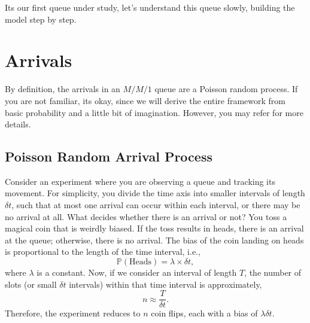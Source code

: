 \documentclass[11pt, a4paper]{report}
\begin{document}
Its our first queue under study, let's understand this queue slowly, building the model step by step.

\section{Arrivals}
By definition, the arrivals in an $M/M/1$ queue are a Poisson random process. If you are not familiar, its okay, since we will derive the entire framework from basic probability and a little bit of imagination. However, you may refer \cite{pishro2014introduction} for more details.

\subsection{Poisson Random Arrival Process}
Consider an experiment where you are observing a queue and tracking its movement. For simplicity, you divide the time axis into smaller intervals of length $\delta t$, such that at most one arrival can occur within each interval, or there may be no arrival at all. What decides whether there is an arrival or not? You toss a magical coin that is weirdly biased. If the toss results in heads, there is an arrival at the queue; otherwise, there is no arrival. The bias of the coin landing on heads is proportional to the length of the time interval, i.e., 
$$\mathbb{P}(\text{Heads}) = \lambda \times \delta t,$$ 
where $\lambda$ is a constant. Now, if we consider an interval of length $T$, the number of slots (or small $\delta t$ intervals) within that time interval is approximately, 
$$n \approx \frac{T}{\delta t}.$$ 
Therefore, the experiment reduces to $n$ coin flips, each with a bias of $\lambda \delta t$. 
\end{document}
